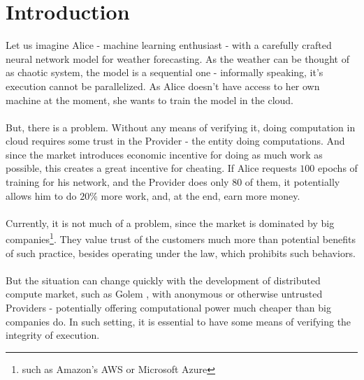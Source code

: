 \documentclass{winnower}
\begin{document}
\section{Introduction}

Let us imagine Alice - machine learning enthusiast - with a carefully crafted neural network model for weather forecasting. As the weather can be thought of as chaotic system, the model is a sequential one - informally speaking, it's execution cannot be parallelized. As Alice doesn't have access to her own machine at the moment, she wants to train the model in the cloud.\\
\\
But, there is a problem. Without any means of verifying it, doing computation in cloud requires some trust in the Provider - the entity doing computations. And since the market introduces economic incentive for doing as much work as possible, this creates a great incentive for cheating. If Alice requests $100$ epochs of training for his network, and the Provider does only $80$ of them, it potentially allows him to do $20\%$ more work, and, at the end, earn more money.\\
\\
Currently, it is not much of a problem, since the market is dominated by big companies\footnote{such as Amazon's AWS or Microsoft Azure}. They value trust of the customers much more than potential benefits of such practice, besides operating under the law, which prohibits such behaviors.\\
\\
But the situation can change quickly with the development of distributed compute market, such as Golem \citep{golem}, with anonymous or otherwise untrusted Providers - potentially offering computational power much cheaper than big companies do. In such setting, it is essential to have some means of verifying the integrity of execution.\\
\end{document}
